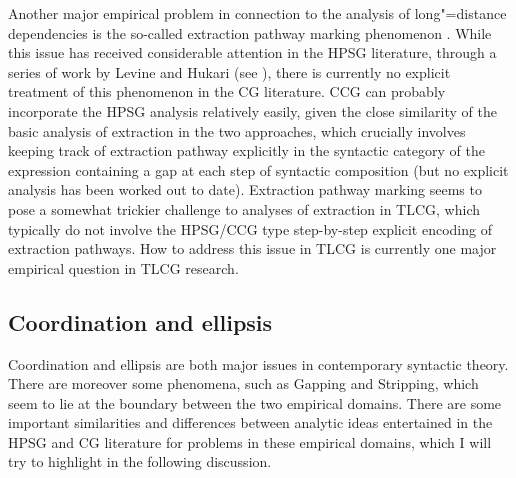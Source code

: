 \documentclass[output=paper]{langsci/langscibook}
\begin{document}
Another major empirical problem in connection to the analysis of
long"=distance dependencies is the so-called extraction pathway marking
phenomenon \citep{mccloskey79,Zaenen83a-u}.  While
this issue has received considerable attention in the HPSG literature,
through a series of work by Levine and Hukari (see \citealt{LH2006a}), there
is currently no explicit treatment of this phenomenon in the CG
literature. CCG can probably incorporate the HPSG analysis relatively
easily, given the close similarity of the basic analysis of extraction
in the two approaches, which crucially involves keeping track of
extraction pathway explicitly in the syntactic category of the
expression containing a gap at each step of syntactic composition (but
no explicit analysis has been worked out to date). Extraction pathway
marking seems to pose a somewhat trickier challenge to analyses of
extraction in TLCG, which typically do not involve the HPSG/CCG type
step-by-step explicit encoding of extraction pathways. How to address
this issue in TLCG is currently one major empirical question in TLCG
research.





\subsection{Coordination and ellipsis}

Coordination and ellipsis are both major issues in contemporary
syntactic theory. There are moreover some phenomena, such as Gapping
and Stripping, which seem to lie at the boundary between the two
empirical domains. There are some important similarities and
differences between analytic ideas entertained in the HPSG and CG
literature for problems in these empirical domains, which I will try
to highlight in the following discussion.
\end{document}
